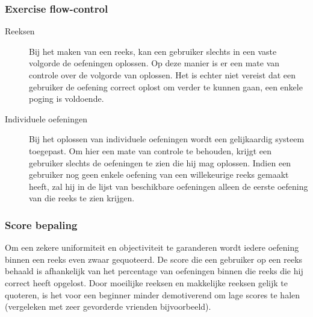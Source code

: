 \subsubsection{Exercise flow-control}
\begin{description}
\item[Reeksen] Bij het maken van een reeks, kan een gebruiker slechts in een vaste volgorde de oefeningen oplossen. Op deze manier is er
een mate van controle over de volgorde van oplossen. Het is echter niet vereist dat een gebruiker de oefening correct oplost
om verder te kunnen gaan, een enkele poging is voldoende.
\item[Individuele oefeningen] Bij het oplossen van individuele oefeningen wordt een gelijkaardig systeem toegepast. Om hier een mate van controle te behouden,
krijgt een gebruiker slechts de oefeningen te zien die hij mag oplossen. Indien een gebruiker nog geen enkele oefening van een
willekeurige reeks gemaakt heeft, zal hij in de lijst van beschikbare oefeningen alleen de eerste oefening van die reeks te zien
krijgen.
\end{description}

\subsubsection{Score bepaling}
Om een zekere uniformiteit en objectiviteit te garanderen wordt iedere oefening binnen een reeks even zwaar gequoteerd. De score
die een gebruiker op een reeks behaald is afhankelijk van het percentage van oefeningen binnen die reeks die hij correct heeft opgelost.
Door moeilijke reeksen en makkelijke reeksen gelijk te quoteren, is het voor een beginner minder demotiverend om lage scores te halen
(vergeleken met zeer gevorderde vrienden bijvoorbeeld).
